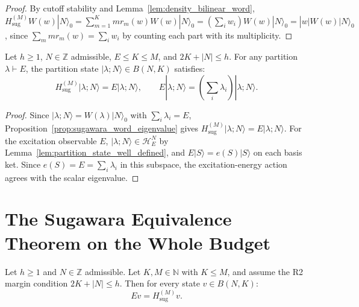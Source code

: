 \begin{proof}
By cutoff stability and Lemma~\ref{lem:density_bilinear_word},
$H_{\mathrm{sug}}^{(M)}W(w)|N\rangle_0=\sum_{m=1}^K m r_m(w)W(w)|N\rangle_0
=(\sum_i w_i)W(w)|N\rangle_0=|w|W(w)|N\rangle_0$, since
$\sum_m m r_m(w)=\sum_iw_i$ by counting each part with its multiplicity.
\end{proof}

\begin{lemma}
\label{lem:sugawara_partition_eigenvalue}
Let $h \ge 1$, $N \in \mathbb{Z}$ admissible, $E \le K \le M$, and $2K + |N| \le h$. For any partition $\lambda \vdash E$, the partition state $|\lambda; N\rangle \in B(N, K)$ satisfies:
\begin{equation}
\label{eq:sugawara_partition_action}
H_{\mathrm{sug}}^{(M)} |\lambda; N\rangle = E |\lambda; N\rangle, \qquad E |\lambda; N\rangle = \left(\sum_i\lambda_i\right)|\lambda; N\rangle.
\end{equation}
\end{lemma}

\begin{proof}
Since $|\lambda; N\rangle = W(\lambda)|N\rangle_0$ with $\sum_i\lambda_i=E$, Proposition~\ref{prop:sugawara_word_eigenvalue} gives $H_{\mathrm{sug}}^{(M)} |\lambda; N\rangle = E |\lambda; N\rangle$. For the excitation observable $E$, $|\lambda; N\rangle \in \mathcal{H}^N_E$ by Lemma~\ref{lem:partition_state_well_defined}, and $E |S\rangle = e(S)|S\rangle$ on each basis ket. Since $e(S)=E=\sum_i\lambda_i$ in this subspace, the excitation-energy action agrees with the scalar eigenvalue.
\end{proof}

\section{The Sugawara Equivalence Theorem on the Whole Budget}

\begin{theorem}
\label{thm:sugawara_equivalence}
Let $h \ge 1$ and $N \in \mathbb{Z}$ admissible. Let $K, M \in \mathbb{N}$ with $K \le M$, and assume the R2 margin condition $2K + |N| \le h$. Then for every state $v \in B(N, K)$:
\begin{equation}
\label{eq:sugawara_equivalence}
E v = H_{\mathrm{sug}}^{(M)} v.
\end{equation}
\end{theorem}

